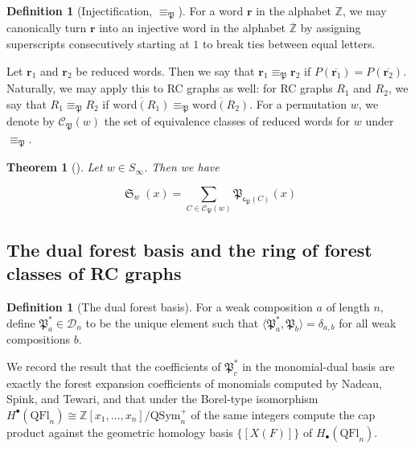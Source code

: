 \documentclass[a4paper,fleqn]{cas-sc}
\newtheorem{theorem}{Theorem}[section]
\theoremstyle{definition}
\newtheorem{definition}[lemma]{Definition}
\theoremstyle{remark}
\numberwithin{equation}{subsection}
\DeclareMathOperator{\sch}{\mathfrak{S}}
\newcommand{\dcoma}{\mathcal{D}}
\newcommand{\code}{\mathfrak{c}}
\newcommand{\forest}{\mathfrak{P}}
\begin{document}
\begin{definition}[Injectification, $\equiv_\forest$]
  For a word $\mathbf{r}$ in the alphabet $\mathbb{Z}$, we may canonically turn $\mathbf{r}$ into an injective word in the alphabet $\overline{\mathbb{Z}}$ by assigning superscripts consecutively starting at $1$ to break ties between equal letters.

Let $\mathbf{r}_1$ and $\mathbf{r}_2$ be reduced words. Then we say that $\mathbf{r}_1\equiv_\forest\mathbf{r}_2$ if $P(\overline{\mathbf{r}_1}) = P(\overline{\mathbf{r}_2})$. Naturally, we may apply this to RC graphs as well: for RC graphs $R_1$ and $R_2$, we say that $R_1\equiv_\forest R_2$ if $\overline{\mathrm{word}(R_1)}\equiv_\forest \overline{\mathrm{word}(R_2)}$. For a permutation $w$, we denote by $\mathcal{C}_\forest(w)$ the set of equivalence classes of reduced words for $w$ under $\equiv_\forest$.
\end{definition}

\begin{theorem}[{\cite[Theorem~1.4]{nadeau2024forest}}] \label{theorem:forestforest}
  Let $w\in S_\infty$. Then we have

  $$\sch_w(x) = \sum_{C\in \mathcal{C}_\forest(w)} \forest_{\code_\forest(C)}(x)$$
\end{theorem}


\subsection{The dual forest basis and the ring of forest classes of RC graphs}

\begin{definition}[The dual forest basis]
  For a weak composition $a$ of length $n$, define $\forest_a^*\in \dcoma_n$ to be the unique element such that $\langle \forest_a^*, \forest_b\rangle = \delta_{a,b}$ for all weak compositions $b$.
\end{definition}

We record the result that the coefficients of $\forest^*_c$ in the monomial-dual basis are exactly the forest expansion coefficients of monomials computed by Nadeau, Spink, and Tewari, and that under the Borel-type isomorphism $H^\bullet(\mathrm{QFl}_n)\cong \mathbb{Z}[x_1,\ldots,x_n]/\mathrm{QSym}_n^+$ of \cite{bergeron2025qsymflag} the same integers compute the cap product against the geometric homology basis $\{[X(F)]\}$ of $H_\bullet(\mathrm{QFl}_n)$.
\end{document}
